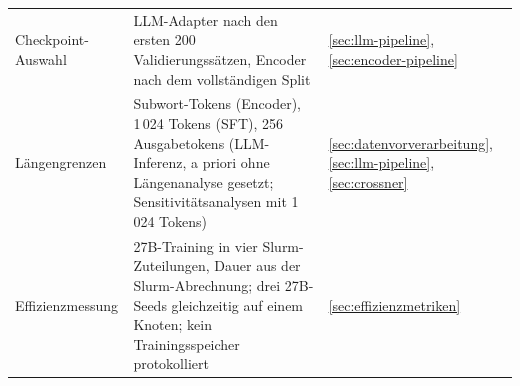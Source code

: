 \begin{table}[ht]
\begin{tabularx}{\linewidth}{@{}>{\raggedright\arraybackslash}p{3.3cm}%
      >{\raggedright\arraybackslash}X%
      >{\raggedright\arraybackslash}p{2cm}@{}}
    \addlinespace
    Checkpoint-Auswahl & LLM-Adapter nach den ersten 200
      Validierungssätzen, Encoder nach dem vollständigen Split &
      \ref{sec:llm-pipeline}, \ref{sec:encoder-pipeline} \\
    \addlinespace
    Längengrenzen & 256 Subwort-Tokens (Encoder), 1\,024 Tokens (SFT),
      256 Ausgabetokens (LLM-Inferenz, a priori ohne Längenanalyse
      gesetzt; Sensitivitätsanalysen mit 1\,024 Tokens) & \ref{sec:datenvorverarbeitung},
      \ref{sec:llm-pipeline}, \ref{sec:crossner} \\
    \addlinespace
    Effizienzmessung & 27B-Training in vier Slurm-Zuteilungen, Dauer aus
      der Slurm-Abrechnung; drei 27B-Seeds gleichzeitig auf einem Knoten;
      kein Trainingsspeicher protokolliert &
      \ref{sec:effizienzmetriken} \\
    \bottomrule
  \end{tabularx}
\end{table}
